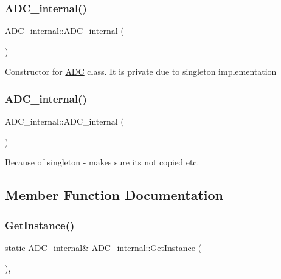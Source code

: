 \subsubsection{\texorpdfstring{A\+D\+C\+\_\+internal()}{ADC\_internal()}\hspace{0.1cm}{\footnotesize\ttfamily [1/2]}}
{\footnotesize\ttfamily A\+D\+C\+\_\+internal\+::\+A\+D\+C\+\_\+internal (\begin{DoxyParamCaption}{ }\end{DoxyParamCaption})\hspace{0.3cm}{\ttfamily [private]}}

Constructor for \hyperlink{class_a_d_c}{A\+DC} class. It is private due to singleton implementation \hypertarget{class_a_d_c__internal_a7ae0c6415d603f8e4b86c735d4d235f5}{}\label{class_a_d_c__internal_a7ae0c6415d603f8e4b86c735d4d235f5} 
\subsubsection{\texorpdfstring{A\+D\+C\+\_\+internal()}{ADC\_internal()}\hspace{0.1cm}{\footnotesize\ttfamily [2/2]}}
{\footnotesize\ttfamily A\+D\+C\+\_\+internal\+::\+A\+D\+C\+\_\+internal (\begin{DoxyParamCaption}\item[{const \hyperlink{class_a_d_c__internal}{A\+D\+C\+\_\+internal} \&}]{ }\end{DoxyParamCaption})\hspace{0.3cm}{\ttfamily [delete]}}

Because of singleton -\/ makes sure its not copied etc. 

\subsection{Member Function Documentation}
\hypertarget{class_a_d_c__internal_aebcca86ecf84a34cbbb0994b4defc692}{}\label{class_a_d_c__internal_aebcca86ecf84a34cbbb0994b4defc692} 
\subsubsection{\texorpdfstring{Get\+Instance()}{GetInstance()}}
{\footnotesize\ttfamily static \hyperlink{class_a_d_c__internal}{A\+D\+C\+\_\+internal}\& A\+D\+C\+\_\+internal\+::\+Get\+Instance (\begin{DoxyParamCaption}{ }\end{DoxyParamCaption})\hspace{0.3cm}{\ttfamily [inline]}, {\ttfamily [static]}}

